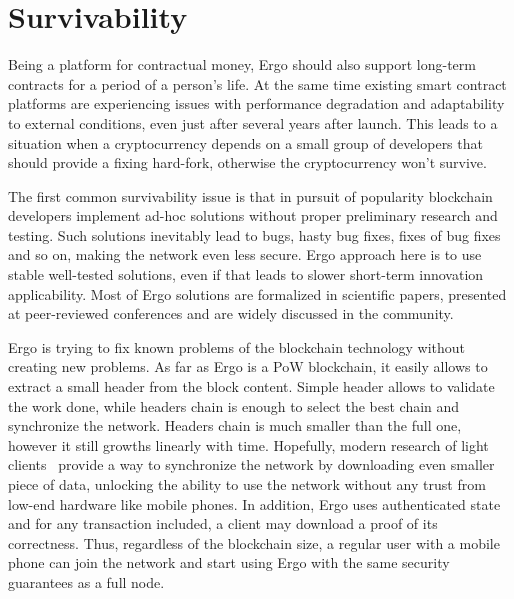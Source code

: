 \section{Survivability}
\label{sec:survivability}


Being a platform for contractual money, Ergo should also support long-term contracts for a
period of a person's life.
At the same time existing smart contract platforms are experiencing issues with performance degradation and
adaptability to external conditions, even just after several years after launch.
This leads to a situation when a cryptocurrency depends on a small group of developers
that should provide a fixing hard-fork, otherwise the cryptocurrency won't survive.

The first common survivability issue is that in pursuit of popularity blockchain developers implement ad-hoc
solutions without proper preliminary research and testing.
Such solutions inevitably lead to bugs, hasty bug fixes, fixes of bug fixes and so on, making the network even less secure.
Ergo approach here is to use stable well-tested solutions, even if that leads to slower
short-term innovation applicability.
Most of Ergo solutions are formalized in scientific papers, presented at peer-reviewed conferences
and are widely discussed in the community.

Ergo is trying to fix known problems of the blockchain technology without creating new problems.
As far as Ergo is a PoW blockchain, it easily allows to extract a small header from the block content.
Simple header allows to validate the work done, while headers chain is enough to select the best chain
and synchronize the network.
Headers chain is much smaller than the full one, however it still growths linearly with time.
Hopefully, modern research of light clients~\cite{nipopows, flight clients} provide a way to
synchronize the network by downloading even smaller piece of data, unlocking the ability to
use the network without any trust from low-end hardware like mobile phones.
In addition, Ergo uses authenticated state\cite{???} and for any transaction included,
a client may download a proof of its correctness.
Thus, regardless of the blockchain size, a regular user with a
mobile phone can join the network and start using Ergo with the same security
guarantees as a full node.

